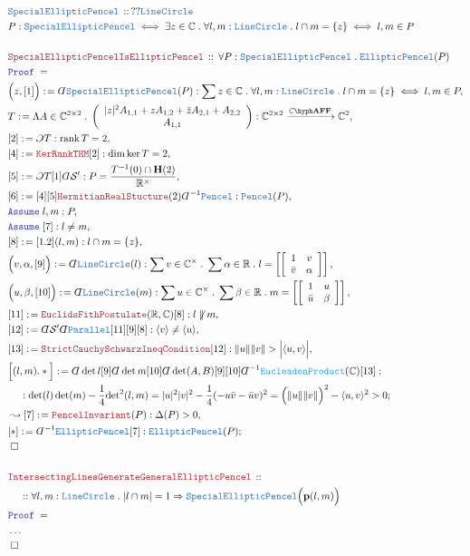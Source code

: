 \documentclass[12pt]{scrartcl}
\newcommand{\TYPE}[1]{\textcolor{NavyBlue}{\mathtt{#1}}}
\newcommand{\FUNC}[1]{\textcolor{Cerulean}{\mathtt{#1}}}
\newcommand{\LOGIC}[1]{\textcolor{Blue}{\mathtt{#1}}}
\newcommand{\THM}[1]{\textcolor{Maroon}{\mathtt{#1}}}
\renewcommand{\.}{\; . \;}
\newcommand{\de}{: \kern 0.1pc =}
\newcommand{\Theorem}[2]{& \THM{#1} \, :: \, #2 \\ & \Proof = \\ }
\newcommand{\DeclareType}[2]{& \TYPE{#1} \, :: \, #2 \\}
\newcommand{\DefineType}[3]{& #1 : \TYPE{#2} \iff #3 \\}
\newcommand{\NewLine}{\\ & \kern 1pc}
\newcommand{\Page}[1]{ \begin{align*} #1 \end{align*}   }
\newcommand{ \bd }{ \ByDef }
\newcommand{\NoProof}{ & \ldots \\ \EndProof}
\newcommand{\Imply}{\Rightarrow}
\newcommand{\Reals}{\mathbb{R} }
\newcommand{\Complex}{\mathbb{C}}
\newcommand{\Arrow}{\xrightarrow}
\newcommand{\Say}[3]{& #1 \de #2 : #3, \\}
\newcommand{\Conclude}[3]{& #1 \de #2 : #3; \\}
\newcommand{\Derive}[3]{& \leadsto #1 \de #2 : #3, \\}
\newcommand{\Assume}[2]{& \LOGIC{Assume} \; #1 : #2, \\}
\newcommand{\QED}{\; \square}
\newcommand{\EndProof}{& \QED \\}
\newcommand{\ByDef}{\rotatebox[origin=c]{-180}{$D$}}%
\newcommand{\ByConstr}{\rotatebox[origin=c]{-180}{$C$}}%
\newcommand{\Proof}{\LOGIC{Proof} \; }
\DeclareMathOperator{\rank}{rank}
\renewcommand{\S}{\mathcal{S}}
\newcommand{\Herm}{\mathbf{H}}
\newcommand{\p}{\mathbf{p}}
\newcommand{\AFF}{\mathbf{AFF}}
\begin{document}
\Page{
	\DeclareType{SpecialEllipticPencel}
	{
		??\TYPE{LineCircle}
	}
	\DefineType{P}{SpecialEllipticPencel}
	{
		\exists z \in \Complex \.
		\forall l,m : \TYPE{LineCircle} \.
		l \cap  m = \{z\} \iff l,m \in P
	}
	\\
	\Theorem{SpecialEllipticPencelIsEllipticPencel}
	{
		\forall P : \TYPE{SpecialEllipticPencel} \.
		\TYPE{EllipticPencel}(P) 
	}
	\Say{\Big(z,[1]\Big)}
	{ \bd \TYPE{SpecialEllipticPencel}(P) }
	{ 
		\sum z \in \Complex \.  
		\forall l,m : \TYPE{LineCircle} \. 
			l \cap m = \{z\} \iff
			l, m \in P
	}
	\Say{T}{\Lambda A \in \Complex^{2 \times 2} \. 
		\left(\begin{array}{c}  
			|z|^2 A_{1,1}  + z A_{1,2} + \bar z A_{2,1} + A_{2,2} \\
			A_{1,1}  
			\end{array} \right)
	}
	{ \Complex^{2 \times 2} \Arrow{\Complex\hyph\mathcal{\AFF}} \Complex^2  }
	\Say{[2]}{ \ByConstr T  }{\rank T = 2 }
	\Say{[4]}{\THM{KerRankTHM}[2]}{ \dim \ker T = 2 }
	\Say{[5]}{\ByConstr T [1] \bd \S' }{ P = \frac{T^{-1}(0) \cap \Herm(2)}{\Reals^\times}  } 
	\Say{[6]}{[4][5]\THM{HermitianRealStucture}(2)\bd^{-1} \TYPE{Pencel}}{\TYPE{Pencel}(P)}
	\Assume{l,m}{P}
	\Assume{[7]}{l \neq m}
	\Say{[8]}{[1.2](l,m)}{l \cap m = \{z\}}
	\Say{\Big( v, \alpha, [9]\Big)}{\bd \TYPE{LineCircle}(l)}
	{
		\sum v \in \Complex^\times \.
		\sum \alpha \in \Reals \.
		l =
		\left[ \left[ 
			\begin{array}{cc}
				1 & v \\
				\bar v & \alpha
			\end{array}
		\right] \right]
	}
	\Say{\Big( u, \beta, [10]\Big)}{\bd \TYPE{LineCircle}(m)}
	{
		\sum u \in \Complex^\times \.
		\sum \beta \in \Reals \.
		m =
		\left[ \left[ 
			\begin{array}{cc}
				1 & u \\
				\bar u & \beta
			\end{array}
		\right] \right]
	}
	\Say{[11]}{\THM{EuclidsFithPostulate}(\Reals,\Complex)[8]}{l \not \parallel m}
	\Say{[12]}{\bd \S'\bd \TYPE{Parallel} [11][9][8]}{\langle v \rangle \neq \langle u \rangle}
	\Say{[13]}{\THM{StrictCauchySchwarzIneqCondition}[12]}
	{
		\| u  \| \| v \| > \Big| \langle u, v \rangle \Big| 
	}
	\Conclude{\Big[(l,m).*\Big]}{ 
		\bd \det l [9] \bd \det m [10] \bd \det(A,B)[9][10]
		\bd^{-1} \FUNC{EucleadenProduct}(\Complex)
		[13]
	}
	{
		\NewLine :
		\det(l) \det(m) - \frac{1}{4}{\det}^2(l,m) =  
		|u|^2|v|^2  -  \frac{1}{4}( -u \bar v - \bar u v  )^2 = 
		\Big(\| u \| \| v \| \Big)^2  - \langle u, v \rangle^2 > 0
	}
	\Derive{[7]}{\THM{PencelInvariant}(P)}{\Delta(P) > 0}
	\Conclude{[*]}{\bd^{-1} \TYPE{EllipticPencel}[7]} 
	{
		\TYPE{EllipticPencel}(P)
	}
	\EndProof
	\\
	\Theorem{IntersectingLinesGenerateGeneralEllipticPencel}
	{
		\NewLine ::
		\forall l,m : \TYPE{LineCircle} \.
		|l \cap m| = 1 \Imply
		\TYPE{SpecialEllipticPencel}\Big( \p(l,m)  \Big)
	}
	\NoProof
}
\end{document}
